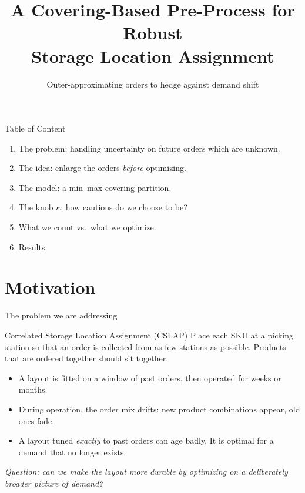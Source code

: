 \documentclass[11pt,aspectratio=169]{beamer}
\title[Robust covering pre-process for CSLAP]{A Covering-Based Pre-Process for Robust\\Storage Location Assignment}
\subtitle{Outer-approximating orders to hedge against demand shift}
\newcommand{\kk}{\kappa}
\begin{document}
\begin{frame}[plain]
  \titlepage
\end{frame}

\begin{frame}{Table of Content}
  \begin{enumerate}
    \item The problem: handling uncertainty on future orders which are unknown.
    \item The idea: enlarge the orders \emph{before} optimizing.
    \item The model: a min--max covering partition.
    \item The knob $\kk$: how cautious do we choose to be?
    \item What we count vs.\ what we optimize.
    \item Results.
  \end{enumerate}
\end{frame}

\section{Motivation}
\begin{frame}{The problem we are addressing}
  \begin{block}{Correlated Storage Location Assignment (CSLAP)}
    Place each SKU at a picking station so that an order is collected from as
    \alert{few stations} as possible. Products that are ordered together should
    sit together.
  \end{block}
  \vspace{0.5em}
  \begin{itemize}
    \item A layout is fitted on a window of \alert{past orders}, then operated
          for weeks or months.
    \item During operation, the order mix \alert{drifts}: new product
          combinations appear, old ones fade.
    \item A layout tuned \emph{exactly} to past orders can age badly. It is
          optimal for a demand that no longer exists.
  \end{itemize}
  \vspace{0.5em}
  \begin{center}
    \emph{Question: can we make the layout more durable by optimizing on a
    deliberately broader picture of demand?}
  \end{center}
\end{frame}
\end{document}
